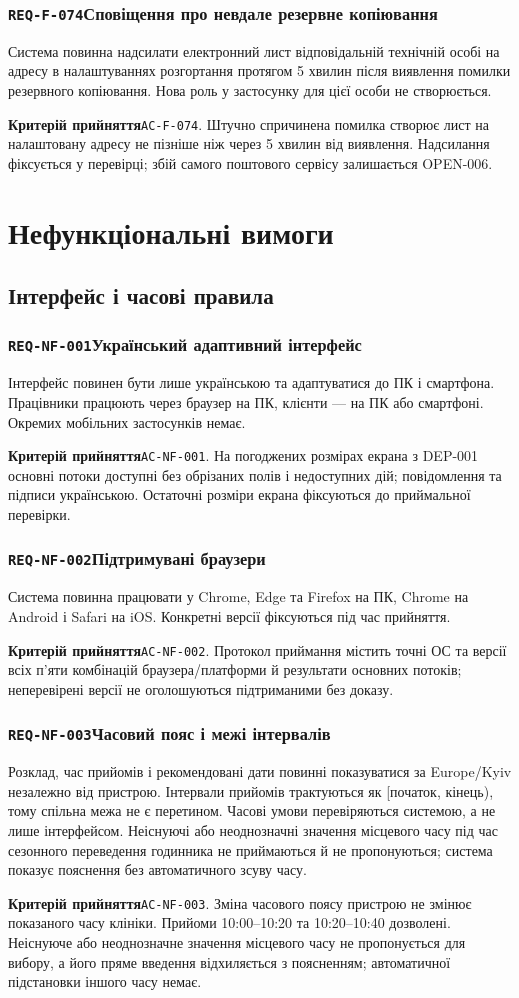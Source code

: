 \documentclass[11pt,a4paper]{article}
\newcommand{\requirement}[4]{%
  \Needspace{7\baselineskip}%
  \subsubsection*{\hypertarget{#1}{\texttt{#1}}\quad #2}%
  #3\par
  \textbf{Критерій прийняття}\quad #4\par\medskip}
\begin{document}
\requirement{REQ-F-074}{Сповіщення про невдале резервне копіювання}{Система повинна надсилати електронний лист відповідальній технічній особі на адресу в налаштуваннях розгортання протягом 5 хвилин після виявлення помилки резервного копіювання. Нова роль у застосунку для цієї особи не створюється.}{\hypertarget{AC-F-074}{\texttt{AC-F-074}}. Штучно спричинена помилка створює лист на налаштовану адресу не пізніше ніж через 5 хвилин від виявлення. Надсилання фіксується у перевірці; збій самого поштового сервісу залишається OPEN-006.}

\section{Нефункціональні вимоги}
\subsection{Інтерфейс і часові правила}
\requirement{REQ-NF-001}{Український адаптивний інтерфейс}{Інтерфейс повинен бути лише українською та адаптуватися до ПК і смартфона. Працівники працюють через браузер на ПК, клієнти — на ПК або смартфоні. Окремих мобільних застосунків немає.}{\hypertarget{AC-NF-001}{\texttt{AC-NF-001}}. На погоджених розмірах екрана з DEP-001 основні потоки доступні без обрізаних полів і недоступних дій; повідомлення та підписи українською. Остаточні розміри екрана фіксуються до приймальної перевірки.}

\requirement{REQ-NF-002}{Підтримувані браузери}{Система повинна працювати у Chrome, Edge та Firefox на ПК, Chrome на Android і Safari на iOS. Конкретні версії фіксуються під час прийняття.}{\hypertarget{AC-NF-002}{\texttt{AC-NF-002}}. Протокол приймання містить точні ОС та версії всіх п’яти комбінацій браузера/платформи й результати основних потоків; неперевірені версії не оголошуються підтриманими без доказу.}

\requirement{REQ-NF-003}{Часовий пояс і межі інтервалів}{Розклад, час прийомів і рекомендовані дати повинні показуватися за Europe/Kyiv незалежно від пристрою. Інтервали прийомів трактуються як [початок, кінець), тому спільна межа не є перетином. Часові умови перевіряються системою, а не лише інтерфейсом. Неіснуючі або неоднозначні значення місцевого часу під час сезонного переведення годинника не приймаються й не пропонуються; система показує пояснення без автоматичного зсуву часу.}{\hypertarget{AC-NF-003}{\texttt{AC-NF-003}}. Зміна часового поясу пристрою не змінює показаного часу клініки. Прийоми 10:00–10:20 та 10:20–10:40 дозволені. Неіснуюче або неоднозначне значення місцевого часу не пропонується для вибору, а його пряме введення відхиляється з поясненням; автоматичної підстановки іншого часу немає.}
\end{document}
